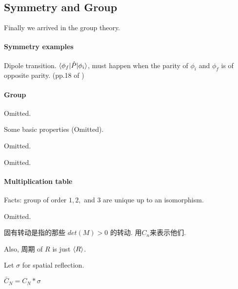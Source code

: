 \subsection{Symmetry and Group}
\label{sec:Symmetry-and-Group}

Finally we arrived in the group theory.
\paragraph{Symmetry examples} Dipole transition. 
$\braket{\phi_f|\hat{P}|\phi_i}$, must happen when the parity of $\phi_i$
and $\phi_f$ is of opposite parity. (pp.18 of \cite{book})

\paragraph{Group}
\begin{defi}[Group]
    Omitted.
\end{defi}
Some basic properties (Omitted).
\begin{defi}
    Omitted.
\end{defi}
\begin{defi}
    Omitted.
\end{defi}

\paragraph{Multiplication table}

Facts: group of order $1,2,$ and $3$ are unique up to an isomorphism.

\begin{defi}
    Omitted.
\end{defi}

\begin{CJK}{UTF8}{gbsn}
固有转动是指的那些 $det(M)>0$ 的转动. 用$C_n$来表示他们.

Also, 周期 of $R$ is just $\braket{R}$.
\end{CJK}

Let $\sigma$ for spatial reflection.
\begin{defi}[$C_N,\bar{C}_N$]
    $\bar{C}_N=C_N*\sigma$
\end{defi}
